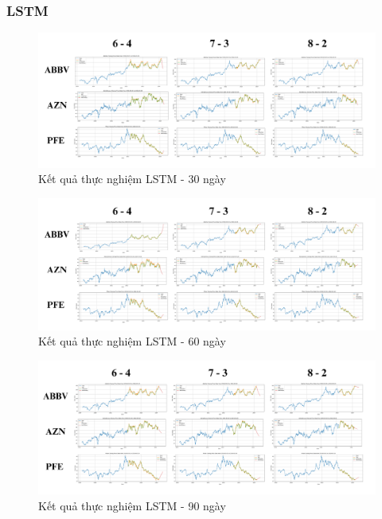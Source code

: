 \documentclass[conference]{IEEEtran}
\begin{document}
\subsubsection{LSTM}
\begin{figure}[H]
    \centering
    \begin{minipage}{0.5\textwidth}
    \centering
    \includegraphics[width=1\textwidth]{Image/LSTM30.png}
    \caption{Kết quả thực nghiệm LSTM - 30 ngày}
    \label{fig:1}
    \end{minipage}
\end{figure}
\begin{figure}[H]
    \centering
    \begin{minipage}{0.5\textwidth}
    \centering
    \includegraphics[width=1\textwidth]{Image/LSTM60.png}
    \caption{Kết quả thực nghiệm LSTM - 60 ngày}
    \label{fig:1}
    \end{minipage}
\end{figure}
\begin{figure}[H]
    \centering
    \begin{minipage}{0.5\textwidth}
    \centering
    \includegraphics[width=1\textwidth]{Image/LSTM90.png}
    \caption{Kết quả thực nghiệm LSTM - 90 ngày}
    \label{fig:1}
    \end{minipage}
\end{figure}
\end{document}
